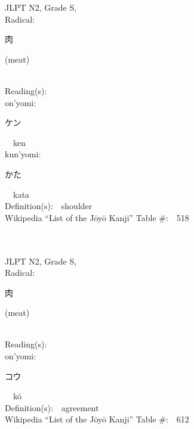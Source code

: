 \begin{multicols}{2}
{JLPT N2, Grade S, \\Radical:\ \ {\begin{CJK}{UTF8}{min} 肉 \end{CJK}} (meat) } \\
Reading(s):\ \ \\
{\hspace*{1em}}on'yomi:\ \ \\
{\hspace*{2em}}{\begin{CJK}{UTF8}{min} ケン \end{CJK}}\ \ ken\ \ \\
{\hspace*{1em}}kun'yomi:\ \ \\
{\hspace*{2em}}{\begin{CJK}{UTF8}{min} かた \end{CJK}}\ \ kata\ \ \\
Definition(s):\ \ shoulder \\
Wikipedia ``List of the J\=oy\=o Kanji'' Table \#:\ \ 518 \\
\ \ \\
{\fontsize{34pt}{40pt}  }\ \ \\  %
{JLPT N2, Grade S, \\Radical:\ \ {\begin{CJK}{UTF8}{min} 肉 \end{CJK}} (meat) } \\
Reading(s):\ \ \\
{\hspace*{1em}}on'yomi:\ \ \\
{\hspace*{2em}}{\begin{CJK}{UTF8}{min} コウ \end{CJK}}\ \ k\=o\ \ \\
Definition(s):\ \ agreement \\
Wikipedia ``List of the J\=oy\=o Kanji'' Table \#:\ \ 612 \\
\ \ \\
{\fontsize{34pt}{40pt}  }\ \ \\  %

\end{multicols}
